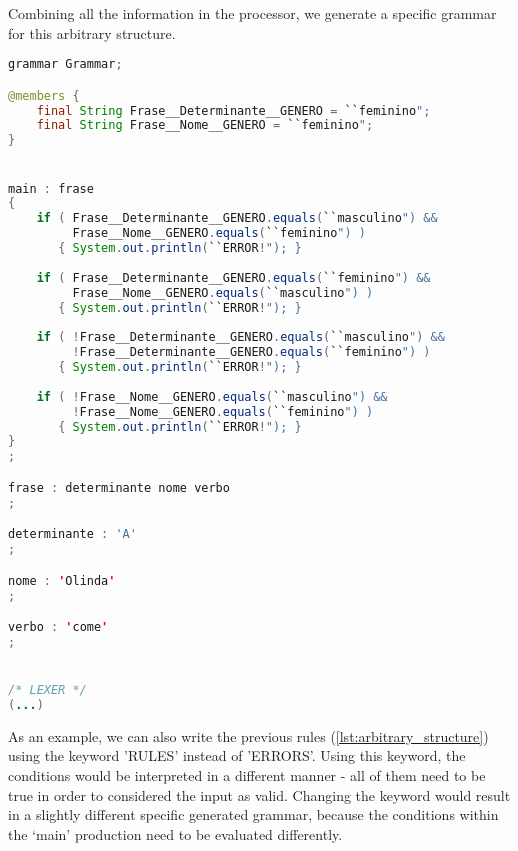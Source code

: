 Combining all the information in the processor, we generate a specific grammar for this arbitrary structure.

\begin{center}
\begin{minipage}{10cm}
\begin{lstlisting}[language=java, basicstyle=\tiny, label={lst:case_study_sentence}, caption=Example of a specific generated grammar.]
grammar Grammar;

@members {
    final String Frase__Determinante__GENERO = ``feminino";
    final String Frase__Nome__GENERO = ``feminino";
}


main : frase
{
    if ( Frase__Determinante__GENERO.equals(``masculino") &&
         Frase__Nome__GENERO.equals(``feminino") ) 
       { System.out.println(``ERROR!"); }
	
    if ( Frase__Determinante__GENERO.equals(``feminino") &&
         Frase__Nome__GENERO.equals(``masculino") ) 
       { System.out.println(``ERROR!"); }
	
    if ( !Frase__Determinante__GENERO.equals(``masculino") &&
         !Frase__Determinante__GENERO.equals(``feminino") ) 
       { System.out.println(``ERROR!"); }
	
    if ( !Frase__Nome__GENERO.equals(``masculino") &&
         !Frase__Nome__GENERO.equals(``feminino") )
       { System.out.println(``ERROR!"); }
}
;

frase : determinante nome verbo 
;

determinante : 'A'
;

nome : 'Olinda'
;

verbo : 'come'
;


/* LEXER */
(...)
\end{lstlisting}
\end{minipage}
\end{center}

As an example, we can also write the previous rules (\autoref{lst:arbitrary_structure}) using the keyword 'RULES' instead of 'ERRORS'.
Using this keyword, the conditions would be interpreted in a different manner - all of them need to be true in order to considered the input as valid.
Changing the keyword would result in a slightly different specific generated grammar, because the conditions within the ‘main’ production need to be evaluated differently.

